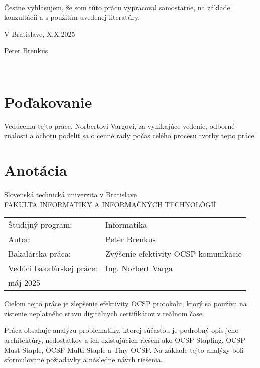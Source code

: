 \documentclass[12pt, twoside]{book}
\def\mfrok{máj 2025}
\def\mfnazov{Zvýšenie efektivity OCSP komunikácie}
\def\mfautor{Peter Brenkus}
\def\mfveduci{Ing. Norbert Varga}
\def\program{ Informatika }
\begin{document}
\frontmatter

\newpage
\thispagestyle{empty} 
~

\vfill
\noindent
Čestne vyhlasujem, že som túto prácu vypracoval samostatne, na základe konzultácií a s použitím uvedenej literatúry.

\bigskip
\bigskip
\noindent
V Bratislave, X.X.2025

{\raggedleft Peter Brenkus\quad \par}
\bigskip

\newpage\null\thispagestyle{empty}\newpage

\newpage
\thispagestyle{empty} 
~

\vfill
\noindent

\section*{Poďakovanie}
\bigskip
\noindent
Vedúcemu tejto práce, Norbertovi Vargovi, za vynikajúce vedenie, odborné znalosti a ochotu podeliť sa o cenné rady počas celého procesu tvorby tejto práce. 
\bigskip
\bigskip
\bigskip
\newpage\null\thispagestyle{empty}\newpage

\newpage 
\thispagestyle{empty}

\section*{Anotácia}
\noindent
Slovenská technická univerzita v Bratislave\\
FAKULTA INFORMATIKY A INFORMAČNÝCH TECHNOLÓGIÍ\\

\begin{tabular}{@{}ll}
Študijný program: & \program\bigskip
\bigskip  \\
Autor: & \mfautor \\
Bakalárska práca: &  \mfnazov \\
Vedúci bakalárskej práce: & \mfveduci \\
\mfrok
\end{tabular}

\bigskip
\bigskip 
\bigskip 
\noindent

Cieľom tejto práce je zlepšenie efektivity OCSP protokolu, ktorý sa používa na zistenie neplatného stavu digitálnych certifikátov v reálnom čase. 

Práca obsahuje analýzu problematiky, ktorej súčasťou je podrobný opis jeho architektúry, nedostatkov a ich existujúcich riešení ako OCSP Stapling, OCSP Must-Staple, OCSP Multi-Staple a Tiny OCSP. Na základe tejto analýzy boli sformulované požiadavky a následne návrh riešenia. 
\end{document}
